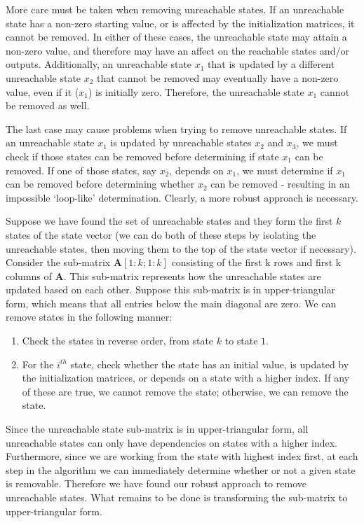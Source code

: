     More care must be taken when removing unreachable states. If an
unreachable state has a non-zero starting value, or is affected by
the initialization matrices, it cannot be removed. In either of
these cases, the unreachable state may attain a non-zero value,
and therefore may have an affect on the reachable states and/or
outputs. Additionally, an unreachable state $x_1$ that is updated
by a different unreachable state $x_2$ that cannot be removed may
eventually have a non-zero value, even if it ($x_1$) is initially
zero. Therefore, the unreachable state $x_1$ cannot be removed as
well.

    The last case may cause problems when trying to remove
unreachable states. If an unreachable state $x_1$ is updated by
unreachable states $x_2$ and $x_3$, we must check if those states
can be removed before determining if state $x_1$ can be removed.
If one of those states, say $x_2$, depends on $x_1$, we must
determine if $x_1$ can be removed before determining whether $x_2$
can be removed - resulting in an impossible `loop-like'
determination. Clearly, a more robust approach is necessary.

    Suppose we have found the set of unreachable states and they
form the first $k$ states of the state vector (we can do both of
these steps by isolating the unreachable states, then moving them
to the top of the state vector if necessary). Consider the
sub-matrix $\mathbf{A}[1:k;1:k]$ consisting of the first k rows
and first k columns of $\mathbf{A}$. This sub-matrix represents
how the unreachable states are updated based on each other.
Suppose this sub-matrix is in upper-triangular form, which means
that all entries below the main diagonal are zero. We can remove
states in the following manner:
\begin{enumerate}
\vspace{\itemshrink} \item Check the states in reverse order, from state $k$ to state
$1$.

\vspace{\itemshrink} \item For the $i^{th}$ state, check whether the state has an
initial value, is updated by the initialization matrices, or
depends on a state with a higher index. If any of these are true,
we cannot remove the state; otherwise, we can remove the state.
\vspace{\itemshrink} \end{enumerate}

    Since the unreachable state sub-matrix is in upper-triangular
form, all unreachable states can only have dependencies on states
with a higher index. Furthermore, since we are working from the
state with highest index first, at each step in the algorithm we
can immediately determine whether or not a given state is
removable. Therefore we have found our robust approach to remove
unreachable states. What remains to be done is transforming the
sub-matrix to upper-triangular form.


